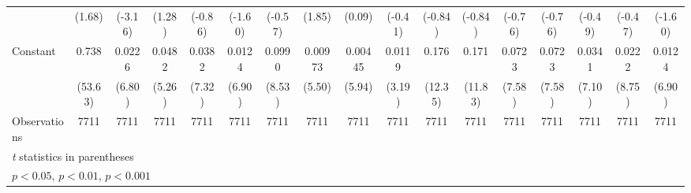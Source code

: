 \begin{table}[htbp]
\begin{tabular}{l*{16}{c}}
                    &      (1.68)         &     (-3.16)         &      (1.28)         &     (-0.86)         &     (-1.60)         &     (-0.57)         &      (1.85)         &      (0.09)         &     (-0.41)         &     (-0.84)         &     (-0.84)         &     (-0.76)         &     (-0.76)         &     (-0.49)         &     (-0.47)         &     (-1.60)         \\
\addlinespace
Constant            &       0.738\sym{***}&      0.0226\sym{***}&      0.0482\sym{***}&      0.0382\sym{***}&      0.0124\sym{***}&      0.0990\sym{***}&     0.00973\sym{***}&     0.00445\sym{***}&      0.0119\sym{**} &       0.176\sym{***}&       0.171\sym{***}&      0.0723\sym{***}&      0.0723\sym{***}&      0.0341\sym{***}&      0.0222\sym{***}&      0.0124\sym{***}\\
                    &     (53.63)         &      (6.80)         &      (5.26)         &      (7.32)         &      (6.90)         &      (8.53)         &      (5.50)         &      (5.94)         &      (3.19)         &     (12.35)         &     (11.83)         &      (7.58)         &      (7.58)         &      (7.10)         &      (8.75)         &      (6.90)         \\
\midrule
Observations        &        7711         &        7711         &        7711         &        7711         &        7711         &        7711         &        7711         &        7711         &        7711         &        7711         &        7711         &        7711         &        7711         &        7711         &        7711         &        7711         \\
\bottomrule
\multicolumn{17}{l}{\footnotesize \textit{t} statistics in parentheses}\\
\multicolumn{17}{l}{\footnotesize \sym{*} \(p<0.05\), \sym{**} \(p<0.01\), \sym{***} \(p<0.001\)}\\
\end{tabular}
\end{table}
